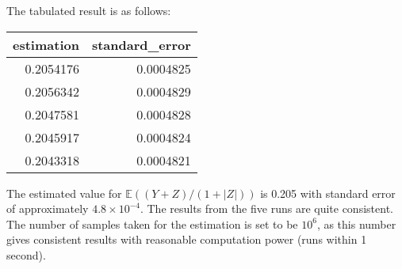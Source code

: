 The tabulated result is as follows:\\
\center
\begin{knitrout}
\color{fgcolor}
\begin{tabular}{r|r}
\hline
estimation & standard\_error\\
\hline
0.2054176 & 0.0004825\\
\hline
0.2056342 & 0.0004829\\
\hline
0.2047581 & 0.0004828\\
\hline
0.2045917 & 0.0004824\\
\hline
0.2043318 & 0.0004821\\
\hline
\end{tabular}


\end{knitrout}
The estimated value for $\mathbb{E}((Y+Z)/(1+|Z|))$ is 0.205 with standard error of approximately \ensuremath{4.8\times 10^{-4}}. The results from the five runs are quite consistent. The number of samples taken for the estimation is set to be $10^6$, as this number gives consistent results with reasonable computation power (runs within 1 second). 
